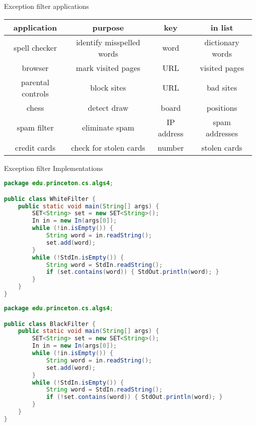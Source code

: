 \documentclass[8pt,a4paper,compress]{beamer}
\begin{document}
\begin{frame}[fragile]
\pause

Exception filter applications
\begin{center}
\begin{tabular}{cccc}
application & purpose & key & in list \\ \hline
spell checker & identify misspelled words & word & dictionary words \\
browser & mark visited pages & URL & visited pages \\
parental controls & block sites & URL & bad sites \\
chess & detect draw & board & positions \\
spam filter & eliminate spam  & IP address & spam addresses \\
credit cards & check for stolen cards & number & stolen cards
\end{tabular} 
\end{center}
\end{frame}

\begin{frame}[fragile]
\pause

Exception filter Implementations
\begin{lstlisting}[language=Java]
package edu.princeton.cs.algs4;

public class WhiteFilter {  
    public static void main(String[] args) {
        SET<String> set = new SET<String>();
        In in = new In(args[0]);
        while (!in.isEmpty()) {
            String word = in.readString();
            set.add(word);
        }
        while (!StdIn.isEmpty()) {
            String word = StdIn.readString();
            if (set.contains(word)) { StdOut.println(word); }
        }
    }
}
\end{lstlisting}

\pause

\begin{lstlisting}[language=Java]
package edu.princeton.cs.algs4;

public class BlackFilter {  
    public static void main(String[] args) {
        SET<String> set = new SET<String>();
        In in = new In(args[0]);
        while (!in.isEmpty()) {
            String word = in.readString();
            set.add(word);
        }
        while (!StdIn.isEmpty()) {
            String word = StdIn.readString();
            if (!set.contains(word)) { StdOut.println(word); }
        }
    }
}
\end{lstlisting}
\end{frame}
\end{document}
